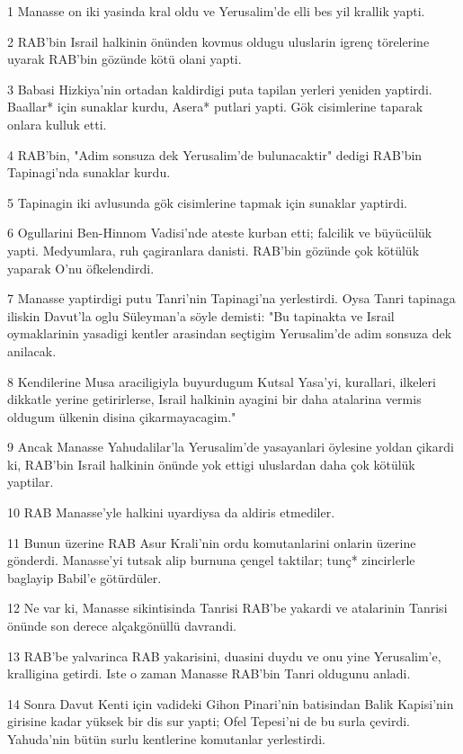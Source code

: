 \par 1 Manasse on iki yasinda kral oldu ve Yerusalim'de elli bes yil krallik yapti.
\par 2 RAB'bin Israil halkinin önünden kovmus oldugu uluslarin igrenç törelerine uyarak RAB'bin gözünde kötü olani yapti.
\par 3 Babasi Hizkiya'nin ortadan kaldirdigi puta tapilan yerleri yeniden yaptirdi. Baallar* için sunaklar kurdu, Asera* putlari yapti. Gök cisimlerine taparak onlara kulluk etti.
\par 4 RAB'bin, "Adim sonsuza dek Yerusalim'de bulunacaktir" dedigi RAB'bin Tapinagi'nda sunaklar kurdu.
\par 5 Tapinagin iki avlusunda gök cisimlerine tapmak için sunaklar yaptirdi.
\par 6 Ogullarini Ben-Hinnom Vadisi'nde ateste kurban etti; falcilik ve büyücülük yapti. Medyumlara, ruh çagiranlara danisti. RAB'bin gözünde çok kötülük yaparak O'nu öfkelendirdi.
\par 7 Manasse yaptirdigi putu Tanri'nin Tapinagi'na yerlestirdi. Oysa Tanri tapinaga iliskin Davut'la oglu Süleyman'a söyle demisti: "Bu tapinakta ve Israil oymaklarinin yasadigi kentler arasindan seçtigim Yerusalim'de adim sonsuza dek anilacak.
\par 8 Kendilerine Musa araciligiyla buyurdugum Kutsal Yasa'yi, kurallari, ilkeleri dikkatle yerine getirirlerse, Israil halkinin ayagini bir daha atalarina vermis oldugum ülkenin disina çikarmayacagim."
\par 9 Ancak Manasse Yahudalilar'la Yerusalim'de yasayanlari öylesine yoldan çikardi ki, RAB'bin Israil halkinin önünde yok ettigi uluslardan daha çok kötülük yaptilar.
\par 10 RAB Manasse'yle halkini uyardiysa da aldiris etmediler.
\par 11 Bunun üzerine RAB Asur Krali'nin ordu komutanlarini onlarin üzerine gönderdi. Manasse'yi tutsak alip burnuna çengel taktilar; tunç* zincirlerle baglayip Babil'e götürdüler.
\par 12 Ne var ki, Manasse sikintisinda Tanrisi RAB'be yakardi ve atalarinin Tanrisi önünde son derece alçakgönüllü davrandi.
\par 13 RAB'be yalvarinca RAB yakarisini, duasini duydu ve onu yine Yerusalim'e, kralligina getirdi. Iste o zaman Manasse RAB'bin Tanri oldugunu anladi.
\par 14 Sonra Davut Kenti için vadideki Gihon Pinari'nin batisindan Balik Kapisi'nin girisine kadar yüksek bir dis sur yapti; Ofel Tepesi'ni de bu surla çevirdi. Yahuda'nin bütün surlu kentlerine komutanlar yerlestirdi.
